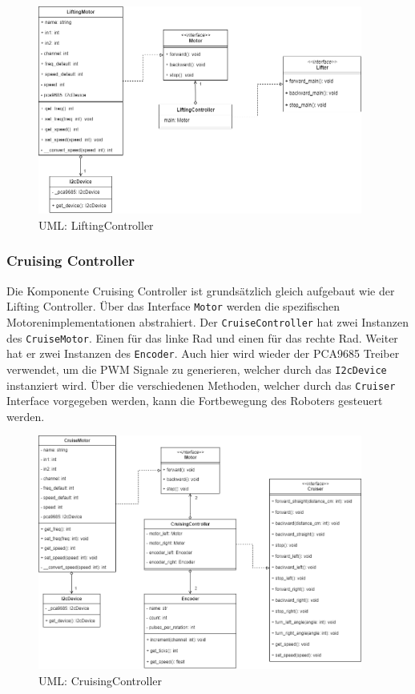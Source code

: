 \begin{figure}[H]
  \includegraphics[width=0.95\textwidth]{img/softwarearchitektur/UML-LiftingController.png}
  \centering
  \caption{UML: LiftingController}
  \label{fig:uml-lifting-controller}
\end{figure}

\newpage

\subsubsection{Cruising Controller}
Die Komponente Cruising Controller ist grundsätzlich gleich aufgebaut wie der Lifting Controller. Über das Interface \texttt{Motor} werden die spezifischen Motorenimplementationen abstrahiert. Der \texttt{CruiseController} hat zwei Instanzen des \texttt{CruiseMotor}. Einen für das linke Rad und einen für das rechte Rad. Weiter hat er zwei Instanzen des \texttt{Encoder}. Auch hier wird wieder der PCA9685 Treiber verwendet, um die PWM Signale zu generieren, welcher durch das \texttt{I2cDevice} instanziert wird. Über die verschiedenen Methoden, welcher durch das \texttt{Cruiser} Interface vorgegeben werden, kann die Fortbewegung des Roboters gesteuert werden.

\begin{figure}[H]
  \includegraphics[width=0.95\textwidth]{img/softwarearchitektur/UML-CruisingController.png}
  \centering
  \caption{UML: CruisingController}
  \label{fig:uml-cruising-controller}
\end{figure}

